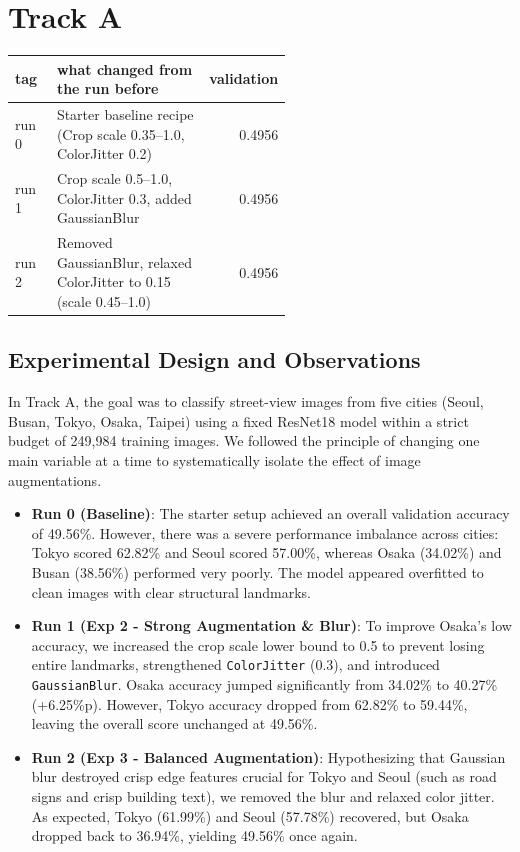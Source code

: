 \documentclass[11pt]{article}
\begin{document}
\makeheader

\section*{Track A}

\begin{center}\footnotesize
\begin{tabular}{lp{0.55\linewidth}r}
\toprule
tag & what changed from the run before & validation \\
\midrule
run 0 & Starter baseline recipe (Crop scale 0.35--1.0, ColorJitter 0.2) & 0.4956 \\
run 1 & Crop scale 0.5--1.0, ColorJitter 0.3, added GaussianBlur & 0.4956 \\
run 2 & Removed GaussianBlur, relaxed ColorJitter to 0.15 (scale 0.45--1.0) & 0.4956 \\
\bottomrule
\end{tabular}
\end{center}

\subsection*{Experimental Design and Observations}

In Track A, the goal was to classify street-view images from five cities (Seoul, Busan, Tokyo, Osaka, Taipei) using a fixed ResNet18 model within a strict budget of 249,984 training images. We followed the principle of changing one main variable at a time to systematically isolate the effect of image augmentations.

\begin{itemize}
    \item \textbf{Run 0 (Baseline)}: The starter setup achieved an overall validation accuracy of 49.56\%. However, there was a severe performance imbalance across cities: Tokyo scored 62.82\% and Seoul scored 57.00\%, whereas Osaka (34.02\%) and Busan (38.56\%) performed very poorly. The model appeared overfitted to clean images with clear structural landmarks.
    \item \textbf{Run 1 (Exp 2 - Strong Augmentation \& Blur)}: To improve Osaka's low accuracy, we increased the crop scale lower bound to 0.5 to prevent losing entire landmarks, strengthened \texttt{ColorJitter} (0.3), and introduced \texttt{GaussianBlur}. Osaka accuracy jumped significantly from 34.02\% to 40.27\% (+6.25\%p). However, Tokyo accuracy dropped from 62.82\% to 59.44\%, leaving the overall score unchanged at 49.56\%.
    \item \textbf{Run 2 (Exp 3 - Balanced Augmentation)}: Hypothesizing that Gaussian blur destroyed crisp edge features crucial for Tokyo and Seoul (such as road signs and crisp building text), we removed the blur and relaxed color jitter. As expected, Tokyo (61.99\%) and Seoul (57.78\%) recovered, but Osaka dropped back to 36.94\%, yielding 49.56\% once again.
\end{itemize}
\end{document}
